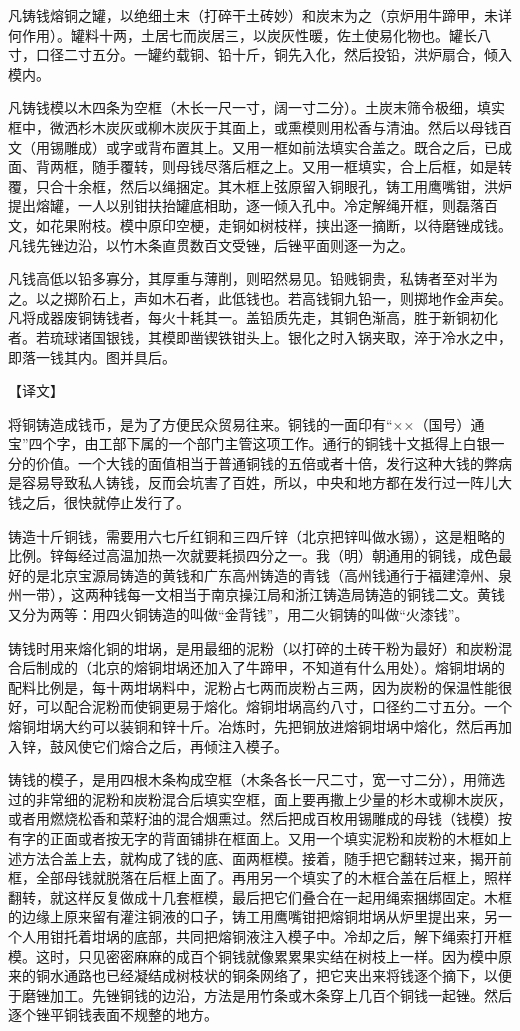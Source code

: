 \documentclass[12pt,UTF8]{ctexbook}
\begin{document}
凡铸钱熔铜之罐，以绝细土末（打碎干土砖妙）和炭末为之（京炉用牛蹄甲，未详何作用）。罐料十两，土居七而炭居三，以炭灰性暖，佐土使易化物也。罐长八寸，口径二寸五分。一罐约载铜、铅十斤，铜先入化，然后投铅，洪炉扇合，倾入模内。

凡铸钱模以木四条为空框（木长一尺一寸，阔一寸二分）。土炭末筛令极细，填实框中，微洒杉木炭灰或柳木炭灰于其面上，或熏模则用松香与清油。然后以母钱百文（用锡雕成）或字或背布置其上。又用一框如前法填实合盖之。既合之后，已成面、背两框，随手覆转，则母钱尽落后框之上。又用一框填实，合上后框，如是转覆，只合十余框，然后以绳捆定。其木框上弦原留入铜眼孔，铸工用鹰嘴钳，洪炉提出熔罐，一人以别钳扶抬罐底相助，逐一倾入孔中。冷定解绳开框，则磊落百文，如花果附枝。模中原印空梗，走铜如树枝样，挟出逐一摘断，以待磨锉成钱。凡钱先锉边沿，以竹木条直贯数百文受锉，后锉平面则逐一为之。

凡钱高低以铅多寡分，其厚重与薄削，则昭然易见。铅贱铜贵，私铸者至对半为之。以之掷阶石上，声如木石者，此低钱也。若高钱铜九铅一，则掷地作金声矣。凡将成器废铜铸钱者，每火十耗其一。盖铅质先走，其铜色渐高，胜于新铜初化者。若琉球诸国银钱，其模即凿锲铁钳头上。银化之时入锅夹取，淬于冷水之中，即落一钱其内。图并具后。

【译文】

将铜铸造成钱币，是为了方便民众贸易往来。铜钱的一面印有“××（国号）通宝”四个字，由工部下属的一个部门主管这项工作。通行的铜钱十文抵得上白银一分的价值。一个大钱的面值相当于普通铜钱的五倍或者十倍，发行这种大钱的弊病是容易导致私人铸钱，反而会坑害了百姓，所以，中央和地方都在发行过一阵儿大钱之后，很快就停止发行了。

铸造十斤铜钱，需要用六七斤红铜和三四斤锌（北京把锌叫做水锡），这是粗略的比例。锌每经过高温加热一次就要耗损四分之一。我（明）朝通用的铜钱，成色最好的是北京宝源局铸造的黄钱和广东高州铸造的青钱（高州钱通行于福建漳州、泉州一带），这两种钱每一文相当于南京操江局和浙江铸造局铸造的铜钱二文。黄钱又分为两等：用四火铜铸造的叫做“金背钱”，用二火铜铸的叫做“火漆钱”。

铸钱时用来熔化铜的坩埚，是用最细的泥粉（以打碎的土砖干粉为最好）和炭粉混合后制成的（北京的熔铜坩埚还加入了牛蹄甲，不知道有什么用处）。熔铜坩埚的配料比例是，每十两坩埚料中，泥粉占七两而炭粉占三两，因为炭粉的保温性能很好，可以配合泥粉而使铜更易于熔化。熔铜坩埚高约八寸，口径约二寸五分。一个熔铜坩埚大约可以装铜和锌十斤。冶炼时，先把铜放进熔铜坩埚中熔化，然后再加入锌，鼓风使它们熔合之后，再倾注入模子。

铸钱的模子，是用四根木条构成空框（木条各长一尺二寸，宽一寸二分），用筛选过的非常细的泥粉和炭粉混合后填实空框，面上要再撒上少量的杉木或柳木炭灰，或者用燃烧松香和菜籽油的混合烟熏过。然后把成百枚用锡雕成的母钱（钱模）按有字的正面或者按无字的背面铺排在框面上。又用一个填实泥粉和炭粉的木框如上述方法合盖上去，就构成了钱的底、面两框模。接着，随手把它翻转过来，揭开前框，全部母钱就脱落在后框上面了。再用另一个填实了的木框合盖在后框上，照样翻转，就这样反复做成十几套框模，最后把它们叠合在一起用绳索捆绑固定。木框的边缘上原来留有灌注铜液的口子，铸工用鹰嘴钳把熔铜坩埚从炉里提出来，另一个人用钳托着坩埚的底部，共同把熔铜液注入模子中。冷却之后，解下绳索打开框模。这时，只见密密麻麻的成百个铜钱就像累累果实结在树枝上一样。因为模中原来的铜水通路也已经凝结成树枝状的铜条网络了，把它夹出来将钱逐个摘下，以便于磨锉加工。先锉铜钱的边沿，方法是用竹条或木条穿上几百个铜钱一起锉。然后逐个锉平铜钱表面不规整的地方。
\end{document}
